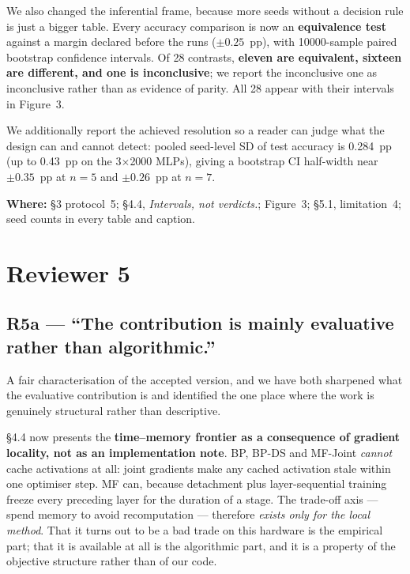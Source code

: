 \documentclass[11pt,a4paper]{article}
\newcommand{\MF}{MF}
\newcommand{\BP}{BP}
\newcommand{\BPDS}{BP-DS}
\newcommand{\where}[1]{\par\smallskip\noindent\textbf{Where:} #1\par}
\begin{document}
We also changed the inferential frame, because more seeds without a decision
rule is just a bigger table. Every accuracy comparison is now an
\textbf{equivalence test} against a margin declared before the runs
($\pm\num{0.25}$~pp), with \num{10000}-sample paired bootstrap confidence
intervals. Of \num{28} contrasts, \textbf{eleven are equivalent, sixteen are
different, and one is inconclusive}; we report the inconclusive one as
inconclusive rather than as evidence of parity. All \num{28} appear with their
intervals in Figure~3.

We additionally report the achieved resolution so a reader can judge what the
design can and cannot detect: pooled seed-level SD of test accuracy is
\num{0.284}~pp (up to \num{0.43}~pp on the 3$\times$2000 MLPs), giving a
bootstrap CI half-width near $\pm\num{0.35}$~pp at $n=5$ and
$\pm\num{0.26}$~pp at $n=7$.

\where{\S3 protocol~5; \S4.4, \emph{Intervals, not verdicts.}; Figure~3;
\S5.1, limitation~4; seed counts in every table and caption.}

\section*{Reviewer 5}

\subsection*{R5a --- ``The contribution is mainly evaluative rather than
algorithmic.''}

A fair characterisation of the accepted version, and we have both sharpened
what the evaluative contribution is and identified the one place where the
work is genuinely structural rather than descriptive.

\S4.4 now presents the \textbf{time--memory frontier as a consequence of
gradient locality, not as an implementation note}. \BP{}, \BPDS{} and
\MF{}-Joint \emph{cannot} cache activations at all: joint gradients make any
cached activation stale within one optimiser step. \MF{} can, because
detachment plus layer-sequential training freeze every preceding layer for the
duration of a stage. The trade-off axis --- spend memory to avoid recomputation
--- therefore \emph{exists only for the local method}. That it turns out to be
a bad trade on this hardware is the empirical part; that it is available at all
is the algorithmic part, and it is a property of the objective structure rather
than of our code.
\end{document}
